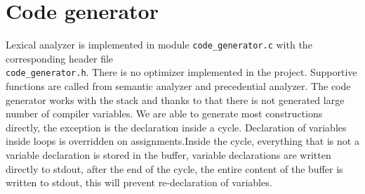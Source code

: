 \section{Code generator}
\label{Code generator}

Lexical analyzer is implemented in module \verb|code_generator.c| with the corresponding header file \\ \verb|code_generator.h|.
There is no optimizer implemented in the project. Supportive functions are called from semantic analyzer and precedential analyzer. The code generator works with the stack and thanks to that there is not generated large number of compiler variables. We are able to generate most constructions directly, the exception is the declaration inside a cycle. Declaration of variables inside loops is overridden on assignments.Inside the cycle, everything that is not a variable declaration is stored in the buffer, variable declarations are written directly to stdout, after the end of the cycle, the entire content of the buffer is written to stdout, this will prevent re-declaration of variables.